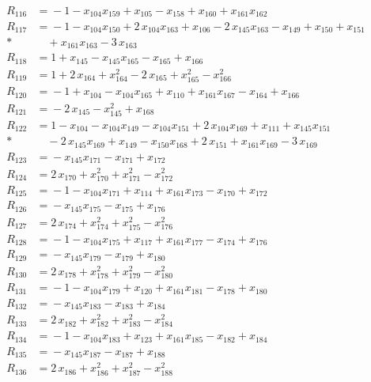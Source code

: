 \begin{align*}
R_{116} &={} -1 -x_{104} x_{159} +x_{105} -x_{158} +x_{160} +x_{161} x_{162} \\[2pt]
R_{117} &={} -1 -x_{104} x_{150} +2\,x_{104} x_{163} +x_{106} -2\,x_{145} x_{163} -x_{149} +x_{150} +x_{151} \\*
&\quad{} +x_{161} x_{163} -3\,x_{163} \\[2pt]
R_{118} &={} 1 +x_{145} -x_{145} x_{165} -x_{165} +x_{166} \\[2pt]
R_{119} &={} 1 +2\,x_{164} +x_{164}^{2} -2\,x_{165} +x_{165}^{2} -x_{166}^{2} \\[2pt]
R_{120} &={} -1 +x_{104} -x_{104} x_{165} +x_{110} +x_{161} x_{167} -x_{164} +x_{166} \\[2pt]
R_{121} &={} -2\,x_{145} -x_{145}^{2} +x_{168} \\[2pt]
R_{122} &={} 1 -x_{104} -x_{104} x_{149} -x_{104} x_{151} +2\,x_{104} x_{169} +x_{111} +x_{145} x_{151} \\*
&\quad{} -2\,x_{145} x_{169} +x_{149} -x_{150} x_{168} +2\,x_{151} +x_{161} x_{169} -3\,x_{169} \\[2pt]
R_{123} &={} -x_{145} x_{171} -x_{171} +x_{172} \\[2pt]
R_{124} &={} 2\,x_{170} +x_{170}^{2} +x_{171}^{2} -x_{172}^{2} \\[2pt]
R_{125} &={} -1 -x_{104} x_{171} +x_{114} +x_{161} x_{173} -x_{170} +x_{172} \\[2pt]
R_{126} &={} -x_{145} x_{175} -x_{175} +x_{176} \\[2pt]
R_{127} &={} 2\,x_{174} +x_{174}^{2} +x_{175}^{2} -x_{176}^{2} \\[2pt]
R_{128} &={} -1 -x_{104} x_{175} +x_{117} +x_{161} x_{177} -x_{174} +x_{176} \\[2pt]
R_{129} &={} -x_{145} x_{179} -x_{179} +x_{180} \\[2pt]
R_{130} &={} 2\,x_{178} +x_{178}^{2} +x_{179}^{2} -x_{180}^{2} \\[2pt]
R_{131} &={} -1 -x_{104} x_{179} +x_{120} +x_{161} x_{181} -x_{178} +x_{180} \\[2pt]
R_{132} &={} -x_{145} x_{183} -x_{183} +x_{184} \\[2pt]
R_{133} &={} 2\,x_{182} +x_{182}^{2} +x_{183}^{2} -x_{184}^{2} \\[2pt]
R_{134} &={} -1 -x_{104} x_{183} +x_{123} +x_{161} x_{185} -x_{182} +x_{184} \\[2pt]
R_{135} &={} -x_{145} x_{187} -x_{187} +x_{188} \\[2pt]
R_{136} &={} 2\,x_{186} +x_{186}^{2} +x_{187}^{2} -x_{188}^{2} \\[2pt]

\end{align*}
